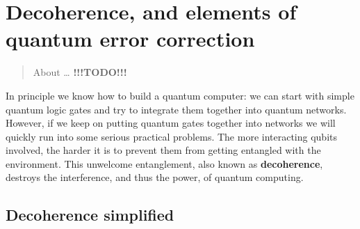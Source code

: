 \documentclass[fleqn]{article}
\let\oldsection\section
\renewcommand\section{\clearpage\oldsection}
\begin{document}
\hypertarget{chapter8}{%
\section{Decoherence, and elements of quantum error correction}\label{chapter8}}

\begin{quote}
About \ldots{} \textbf{!!!TODO!!!}
\end{quote}

In principle we know how to build a quantum computer: we can start with simple quantum logic gates and try to integrate them together into quantum networks.
However, if we keep on putting quantum gates together into networks we will quickly run into some serious practical problems.
The more interacting qubits involved, the harder it is to prevent them from getting entangled with the environment.
This unwelcome entanglement, also known as \textbf{decoherence}, destroys the interference, and thus the power, of quantum computing.

\hypertarget{decoherence-simplified}{%
\subsection{Decoherence simplified}\label{decoherence-simplified}}
\end{document}
